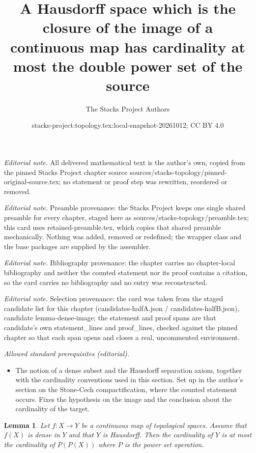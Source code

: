 \documentclass[10pt,a4paper]{amsart}
\title{A Hausdorff space which is the closure of the image of a continuous map has cardinality at most the double power set of the source}
\author{The Stacks Project Authors}
\date{stacks-project:topology.tex:local-snapshot-20261012; CC BY 4.0}
\theoremstyle{plain}
\newtheorem{lemma}[subsection]{Lemma}
\theoremstyle{definition}
\theoremstyle{remark}
\numberwithin{equation}{subsection}
\begin{document}
\maketitle
\noindent\textit{Editorial note.} All delivered mathematical text is the author's own, copied from the pinned Stacks Project chapter source sources/stacks-topology/pinned-original-source.tex; no statement or proof step was rewritten, reordered or removed.\par\medskip
\noindent\textit{Editorial note.} Preamble provenance: the Stacks Project keeps one single shared preamble for every chapter, staged here as sources/stacks-topology/preamble.tex; this card uses retained-preamble.tex, which copies that shared preamble mechanically. Nothing was added, removed or redefined; the wrapper class and the base packages are supplied by the assembler.\par\medskip
\noindent\textit{Editorial note.} Bibliography provenance: the chapter carries no chapter-local bibliography and neither the counted statement nor its proof contains a citation, so the card carries no bibliography and no entry was reconstructed.\par\medskip
\noindent\textit{Editorial note.} Selection provenance: the card was taken from the staged candidate list for this chapter (candidates-halfA.json / candidates-halfB.json), candidate lemma-dense-image; the statement and proof spans are that candidate's own statement\_lines and proof\_lines, checked against the pinned chapter so that each span opens and closes a real, uncommented environment.\par\medskip
\noindent\textit{Allowed standard prerequisites (editorial).}\begin{itemize}
\item The notion of a dense subset and the Hausdorff separation axiom, together with the cardinality conventions used in this section. Set up in the author's section on the Stone-Cech compactification, where the counted statement occurs. Fixes the hypothesis on the image and the conclusion about the cardinality of the target.
\end{itemize}\medskip
\begin{lemma}
\label{lemma-dense-image}
Let $f : X \to Y$ be a continuous map of topological spaces. Assume that
$f(X)$ is dense in $Y$ and that $Y$ is Hausdorff. Then the cardinality
of $Y$ is at most the cardinality of $P(P(X))$ where $P$ is the power
set operation.
\end{lemma}
\end{document}
